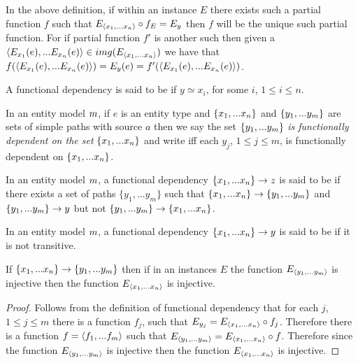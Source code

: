 \begin{remark}
In the above definition, if within an instance $E$ there exists such a partial function $f$ such that
$E_{\langle x_1,...x_n\rangle} \circ f_E = E_y$ then $f$ will be the unique such partial function. For if 
partial function $f'$ is another such then given a $\langle E_{x_1}(e),...E_{x_n}(e)\rangle \in img(E_{\langle x_1,...x_n\rangle})$
we have that $f(\langle E_{x_1}(e),...E_{x_n}(e)\rangle)=E_y(e)=f'(\langle E_{x_1}(e),...E_{x_n}(e)\rangle)$.
\end{remark}

\begin{definition}
A functional dependency  is said to be  if $y\simeq x_i$, for some $i$, $1 \leq i \leq n$.
\end{definition}

\begin{definition}
In an entity model ${m}$, if
$e$ is an entity type and $\left\{x_1,...x_n\right\}$ and $\left\{y_1,...y_m\right\}$ are sets of simple paths with source $a$
then we say the set $\left\{y_1,...y_m\right\}$ \textit{is functionally dependent on the set} $\left\{x_1,...x_n\right\}$ and write
iff  each $y_j$, $1 \leq j \leq m$, is functionally dependent on $\left\{x_1,...x_n\right\}$.
\end{definition}
\begin{definition} %
In an entity model ${m}$, a functional dependency $\left\{x_1,...x_n\right\} \rightarrow z$
is said to be  if there exists a set of paths $\{y_1,...y_{m}\}$ such that
$\left\{x_1,...x_n\right\} \rightarrow \left\{y_1,...y_{m}\right\}$ and $\left\{y_1,...y_{m}\right\} \rightarrow y$ but not
$\{y_1,...y_{m}\} \rightarrow \{x_1,...x_n\}$.
\end{definition}
\begin{definition} %
In an entity model ${m}$, a functional dependency $\left\{x_1,...x_n\right\} \rightarrow y$
is said to be  if it is not transitive.
\end{definition}
\begin{lemma}
\label{transitiveinjectivelemma}
If $\left\{x_1,...x_n\right\} \rightarrow \left\{y_1,...y_{m}\right\}$ then if in an instances $E$ the function $E_{\langle y_1,...y_{m}\rangle}$ is 
injective then the function $E_{\langle x_1,...x_n\rangle}$  is injective.
\end{lemma}
\begin{proof}
Follows from the definition of functional dependency that for each $j$, $1 \leq j \leq m$  there is a function ${f_j}$,  such that
$E_{y_j}=E_{\langle x_1,...x_n\rangle}\circ f_j$. Therefore there is a function $f=\langle f_1,...f_m\rangle$ such that
$E_{\langle y_1,...y_m\rangle}= E_{\langle x_1,...x_n\rangle}\circ f $. Therefore since  the function $E_{\langle y_1,...y_{m}\rangle}$ is 
injective then the function $E_{\langle x_1,...x_n\rangle}$  is injective.
\end{proof}

